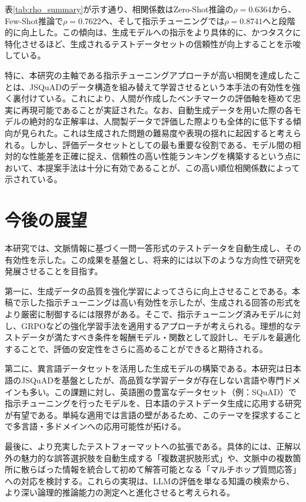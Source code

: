 \documentclass[twocolumn]{jsarticle}
\begin{document}
表\ref{tab:rho_summary}が示す通り、相関係数はZero-Shot推論の$\rho=0.6364$から、Few-Shot推論で$\rho=0.7622$へ、そして指示チューニングでは$\rho=0.8741$へと段階的に向上した。この傾向は、生成モデルへの指示をより具体的に、かつタスクに特化させるほど、生成されるテストデータセットの信頼性が向上することを示唆している。

特に、本研究の主軸である指示チューニングアプローチが高い相関を達成したことは、JSQuADのデータ構造を組み替えて学習させるという本手法の有効性を強く裏付けている。これにより、人間が作成したベンチマークの評価軸を極めて忠実に再現可能であることが実証された。なお、自動生成データを用いた際の各モデルの絶対的な正解率は、人間製データで評価した際よりも全体的に低下する傾向が見られた。これは生成された問題の難易度や表現の揺れに起因すると考えられる。しかし、評価データセットとしての最も重要な役割である、モデル間の相対的な性能差を正確に捉え、信頼性の高い性能ランキングを構築するという点において、本提案手法は十分に有効であることが、この高い順位相関係数によって示されている。



\section{今後の展望}

本研究では、文脈情報に基づく一問一答形式のテストデータを自動生成し、その有効性を示した。この成果を基盤とし、将来的には以下のような方向性で研究を発展させることを目指す。

第一に、生成データの品質を強化学習によってさらに向上させることである。本稿で示した指示チューニングは高い有効性を示したが、生成される回答の形式をより厳密に制御するには限界がある。そこで、指示チューニング済みモデルに対し、GRPOなどの強化学習手法を適用するアプローチが考えられる。理想的なテストデータが満たすべき条件を報酬モデル・関数として設計し、モデルを最適化することで、評価の安定性をさらに高めることができると期待される。

第二に、異言語データセットを活用した生成モデルの構築である。本研究は日本語のJSQuAD\cite{JSQuAD}を基盤としたが、高品質な学習データが存在しない言語や専門ドメインも多い。この課題に対し、英語圏の豊富なデータセット（例：SQuAD\cite{SQuAD}）で指示チューニングを行ったモデルを、日本語のテストデータ生成に応用する研究が有望である。単純な適用では言語の壁があるため、このテーマを探求することで多言語・多ドメインへの応用可能性が拓ける。

最後に、より充実したテストフォーマットへの拡張である。具体的には、正解以外の魅力的な誤答選択肢を自動生成する「複数選択肢形式」や、文脈中の複数箇所に散らばった情報を統合して初めて解答可能となる「マルチホップ質問応答」への対応を検討する。これらの実現は、LLMの評価を単なる知識の検索から、より深い論理的推論能力の測定へと進化させると考えられる。
\end{document}
